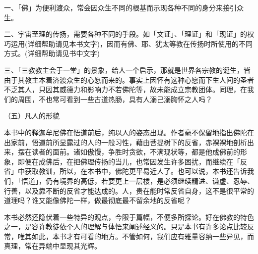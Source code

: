 \documentclass[12pt,twoside,openany]{book}
\begin{document}
一、「佛」为便利渡众，常会因众生不同的根基而示现各种不同的身分来接引众生。

二、宇宙至理的传扬，需要各种不同的手段。如「文证」、「理证」和「现证」的权巧运用(详细帮助请见本书文字)，因而有佛、耶、犹太等教在传扬时所使用的不同方式。(详细帮助请见书中文字)

三、「三教教主会于一堂」的景象，给人一个启示，那就是世界各宗教的诞生，皆由于其教主本着济渡众生的心愿而来的。事实上因怀有这种心愿而下生人间的圣者不乏其人，只因其威德力和影响力不若佛陀等，故未能成立宗教团体。同理，在我们的周围，不也常可看到一些古道热肠，具有人溺己溺胸怀之人吗？

（五）凡人的形貌

本书中的释迦牟尼佛在悟道前后，纯以人的姿态出现。作者毫不保留地指出佛陀在出家前，悟道前所显露过的人的一般习性，藉由菩提树下的反省，赤裸裸地剖析出来，摆在读者的面前。诸如傲慢，争胜时贪欲，不满现状等，都是他成佛前的形象，即便在成佛后，在把佛理传扬的当儿，也常因发生许多困扰，而继续在「反省」中获取教训，所以，在本书中，佛陀更平易近人了。也可以说，本书还告诉我们，「悟道」，仍有境界的高低，若要更上一层楼，是必须继续精进、谦虚、忍辱、行善，以及靠不断的反省才能达成的。人，贵在能时常反省自身，这不是很平常的道理吗？谁又能像佛陀一样，做最彻底最不留余地的反省呢？

本书必然还隐伏着一些特异的观点，今限于篇幅，不便多所探论。好在佛教的特色之一，是容许教徒依个人的理解与体悟来阐述经义的。只是本书有许多论点比较反常，唯其如此，本书才有可看的地方。不管如何，我们应有雅量容纳一些异见，而真理，常在异端中显现其光辉。
\end{document}
